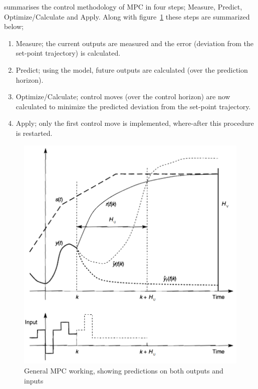 \citet[8]{maciejowskimpc} summarises the control methodology of MPC in four steps; Measure, Predict, Optimize/Calculate and Apply. 
Along with figure~\ref{fig:mpc:general} these steps are summarized below;
\begin{enumerate}
  \item Measure; the current outputs are measured and the error (deviation from the set-point trajectory) is calculated.
  \item Predict; using the model, future outputs are calculated (over the prediction horizon).
  \item Optimize/Calculate; control moves (over the control horizon) are now calculated to minimize the predicted deviation from the set-point trajectory.
  \item Apply; only the first control move is implemented, where-after this procedure is restarted.
\end{enumerate}
\begin{figure}[htbp]
  \centering
  \includegraphics[width=\fullwidth]{graph/mpc_general}
  \caption[General MPC working]{General MPC working, showing predictions on both outputs and inputs}
  \label{fig:mpc:general}
\end{figure}

